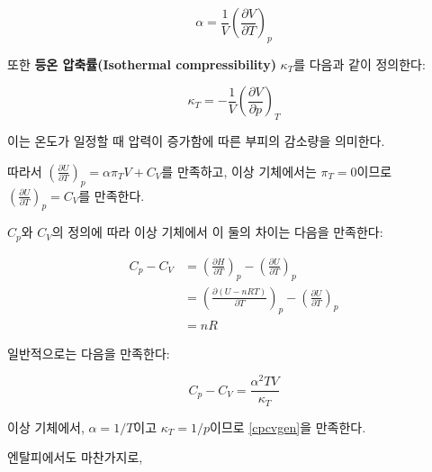         \begin{defn}[열팽창률]
        \begin{equation*}
            \alpha = \frac{1}{V} \left(\frac{\partial V}{\partial T} \right)_p
        \end{equation*}
        \end{defn}
        또한 \textbf{등온 압축률(Isothermal compressibility)} $\kappa_T$를 다음과 같이 정의한다:
        \begin{defn}[등온 압축률]
        \begin{equation*}
            \kappa_T = -\frac{1}{V}\left(\frac{\partial V}{\partial p}\right)_T
        \end{equation*}
        \end{defn}
        이는 온도가 일정할 때 압력이 증가함에 따른 부피의 감소량을 의미한다.
        \par 따라서 $\displaystyle\left(\frac{\partial U}{\partial T}\right)_p = \alpha \pi_T V + C_V$를 만족하고, 이상 기체에서는 $\pi_T = 0$이므로 
        $\displaystyle\left(\frac{\partial U}{\partial T}\right)_p = C_V$를 만족한다.
        \par $C_p$와 $C_V$의 정의에 따라 이상 기체에서 이 둘의 차이는 다음을 만족한다:
        \begin{cor}
        \begin{equation*}
            \begin{aligned}
                C_p - C_V &= \left(\frac{\partial H}{\partial T}\right)_p - \left(\frac{\partial U}{\partial T} \right)_p\\
                &= \left(\frac{\partial \left(U-nRT\right)}{\partial T}\right)_p - \left(\frac{\partial U}{\partial T}\right)_p\\
                &= nR
            \end{aligned}
        \end{equation*}
        \end{cor}
        일반적으로는 다음을 만족한다:
        \begin{cor}\label{cpcvgen}
        \begin{equation*}
            C_p - C_V = \frac{\alpha^2 TV}{\kappa_T}
        \end{equation*}
        \end{cor}
        이상 기체에서, $\alpha = 1/T$이고 $\kappa_T = 1/p$이므로 \ref{cpcvgen}을 만족한다.
        \par 엔탈피에서도 마찬가지로,
